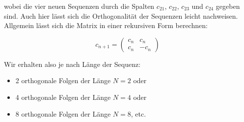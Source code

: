 \begin{beispiel}
wobei die vier neuen Sequenzen durch die Spalten $c_{21}$, $c_{22}$, $c_{23}$ und $c_{24}$ gegeben sind. Auch hier lässt sich die Orthogonalität der Sequenzen leicht nachweisen. Allgemein lässt sich die Matrix in einer rekursiven Form berechnen:

$$
c_{n+1} = \begin{pmatrix} c_n & c_n \\ c_n & -c_n \end{pmatrix}
$$

Wir erhalten also je nach Länge der Sequenz:
\begin{itemize}
  \item 2 orthogonale Folgen der Länge $N = 2$ oder
  \item 4 orthogonale Folgen der Länge $N = 4$ oder
  \item 8 orthogonale Folgen der Länge $N = 8$, etc.
\end{itemize}
\end{beispiel}

